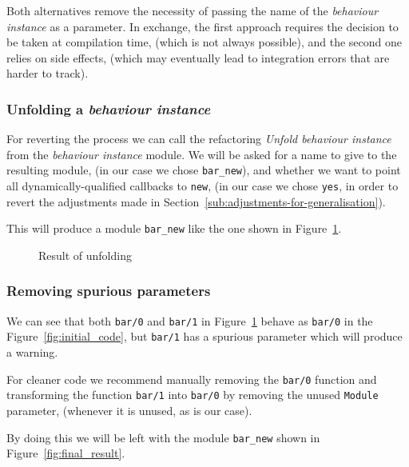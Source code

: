 Both alternatives remove the necessity of passing the name of the
\emph{behaviour instance} as a parameter. In exchange, the first approach
requires the decision to be taken at compilation time, (which is not
always possible), and the second one relies on side effects, (which
may eventually lead to integration errors that are harder to track).


\subsubsection{Unfolding a \emph{behaviour instance}}

For reverting the process we can call the refactoring \emph{Unfold
behaviour instance} from the \emph{behaviour instance} module. We
will be asked for a name to give to the resulting module, (in our
case we chose \texttt{bar\_new}), and whether we want to point all
dynamically-qualified callbacks to \texttt{new}, (in our case we chose
\texttt{yes}, in order to revert the adjustments made in Section~\ref{sub:adjustments-for-generalisation}).

This will produce a module \texttt{bar\_new} like the one shown in
Figure~\ref{fig:unfold_result}.

\begin{figure}
\label{fig:unfold_result}

\caption{Result of unfolding}
\end{figure}



\subsubsection{Removing spurious parameters}

We can see that both \texttt{bar/0} and \texttt{bar/1} in Figure~\ref{fig:unfold_result}
behave as \texttt{bar/0} in the Figure~\ref{fig:initial_code}, but
\texttt{bar/1} has a spurious parameter which will produce a warning.

For cleaner code we recommend manually removing the \texttt{bar/0}
function and transforming the function \texttt{bar/1} into \texttt{bar/0}
by removing the unused \texttt{Module} parameter, (whenever it is
unused, as is our case).

By doing this we will be left with the module \texttt{bar\_new} shown
in Figure~\ref{fig:final_result}.

